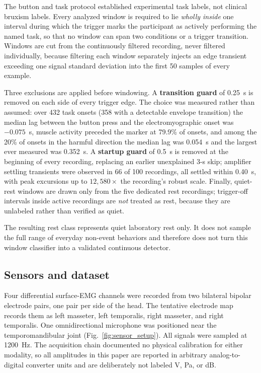 \documentclass[pdflatex,sn-nature,iicol]{sn-jnl}
\begin{document}
The button and task protocol established experimental task labels, not clinical bruxism labels. Every analyzed window is required to lie \emph{wholly inside} one interval during which the trigger marks the participant as actively performing the named task, so that no window can span two conditions or a trigger transition. Windows are cut from the continuously filtered recording, never filtered individually, because filtering each window separately injects an edge transient exceeding one signal standard deviation into the first 50 samples of every example.

Three exclusions are applied before windowing. A \textbf{transition guard} of 0.25~s is removed on each side of every trigger edge. The choice was measured rather than assumed: over 432 task onsets (358 with a detectable envelope transition) the median lag between the button press and the electromyographic onset was $-0.075$~s, muscle activity preceded the marker at 79.9\% of onsets, and among the 20\% of onsets in the harmful direction the median lag was 0.054~s and the largest ever measured was 0.352~s. A \textbf{startup guard} of 0.5~s is removed at the beginning of every recording, replacing an earlier unexplained 3-s skip; amplifier settling transients were observed in 66 of 100 recordings, all settled within 0.40~s, with peak excursions up to $12{,}580\times$ the recording's robust scale. Finally, quiet-rest windows are drawn only from the five dedicated rest recordings; trigger-off intervals inside active recordings are \emph{not} treated as rest, because they are unlabeled rather than verified as quiet.

The resulting rest class represents quiet laboratory rest only. It does not sample the full range of everyday non-event behaviors and therefore does not turn this window classifier into a validated continuous detector.

\subsection{Sensors and dataset}

Four differential surface-EMG channels were recorded from two bilateral bipolar electrode pairs, one pair per side of the head. The tentative electrode map records them as left masseter, left temporalis, right masseter, and right temporalis. One omnidirectional microphone was positioned near the temporomandibular joint (Fig.~\ref{fig:sensor_setup}). All signals were sampled at 1200~Hz. The acquisition chain documented no physical calibration for either modality, so all amplitudes in this paper are reported in arbitrary analog-to-digital converter units and are deliberately not labeled \textmu V, Pa, or dB.
\end{document}
